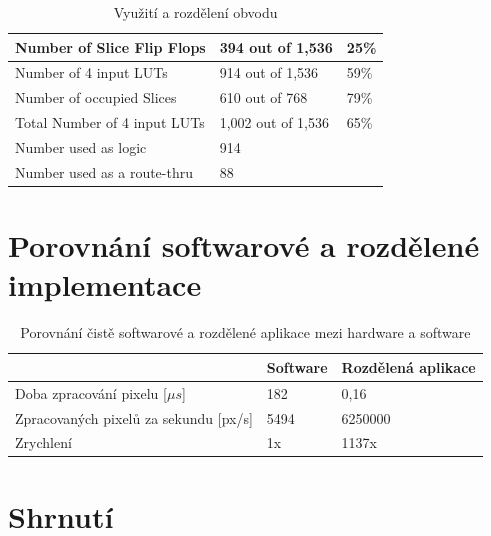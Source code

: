 \documentclass[12pt,a4paper,titlepage,final]{report}
\begin{document}
\begin{table}[h!]
	\begin{center}
    \begin{tabular}{ | p{4cm} | p{4cm} | p{4cm} |}    
	\hline    
   	Number of Slice Flip Flops & 394 out of 1,536 & 25\% 
	\\ \hline
	Number of 4 input LUTs & 914 out of 1,536 & 59\%	
	\\ \hline
	Number of occupied Slices & 610 out of 768 & 79\% 
	\\ \hline
	Total Number of 4 input LUTs & 1,002 out of 1,536 & 65\%	
	\\ \hline 
	Number used as logic & 914 &
	\\ \hline 
    Number used as a route-thru & 88 &
	\\ \hline     	
	
    \end{tabular}
	\end{center}	
	\caption{Využití a rozdělení obvodu}  
\end{table}



\section{Porovnání softwarové a rozdělené implementace}


\begin{table}[h!]
	\begin{center}
    \begin{tabular}{ | p{4cm} | p{4cm} | p{4cm} |}    
	\hline 
	& Software & Rozdělená aplikace   
	\\ \hline
	Doba zpracování pixelu [$\mu s$] & 182 & 0,16
	\\ \hline 
	Zpracovaných pixelů za sekundu [px/s] & 5494 & 6250000
	\\ \hline 
	Zrychlení & 1x & 1137x
	\\ \hline     
	
    \end{tabular}
	\end{center}	
	\caption{Porovnání čistě softwarové a rozdělené aplikace mezi hardware a software}  
\end{table}

\section{Shrnutí}
\end{document}
